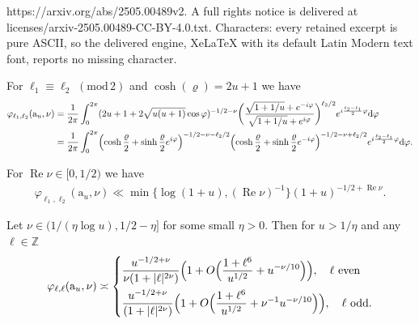 \documentclass[10pt,a4paper]{amsart}
\newcommand{\Z}{{\mathbb Z}}
\renewcommand{\Re}{\operatorname{Re}}
\renewcommand{\a}{\mathrm{a}}
\renewcommand{\d}{\mathrm d}
\renewcommand{\phi}{\varphi}
\renewcommand{\pmod}[1]{\,\,(\mathrm{mod}\,{#1})}
\begin{document}
https://arxiv.org/abs/2505.00489v2. A full rights notice is delivered at licenses/arxiv-2505.00489-CC-BY-4.0.txt. Characters: every retained excerpt is pure ASCII, so the delivered engine, XeLaTeX with its default Latin Modern text font, reports no missing character.
\begin{lemma}\label{lem:phirewritten}
For $\ell_1 \equiv \ell_2 \pmod{2}$ and $ \cosh(\varrho) = 2u+1$  we have
    \begin{align*}
       \phi_{\ell_1,\ell_2}(\a_u,\nu) &= \frac{1}{ 2\pi } \int_0^{2\pi } (2u+1 + 2\sqrt{u(u+1)} \cos \varphi)^{-1/2-\nu}  
 \bigg(\frac{\sqrt{1+1/u} + e^{-i\varphi}}{\sqrt{1+1/u} + e^{i\varphi}}\bigg)^{\ell_2/2} e^{i\frac{\ell_2-\ell_1}{2} \varphi } \d \varphi\\
 &= \frac{1}{2 \pi } \int_0^{2\pi} \Bigl(\cosh \frac{\varrho}{2}+\sinh \frac{\varrho}{2} e^{i \varphi}\Bigr)^{-1/2-\nu-\ell_2/2}\Bigl(\cosh \frac{\varrho}{2}+\sinh \frac{\varrho}{2} e^{-i\varphi}\Bigr)^{-1/2-\nu+\ell_2/2} e^{i\frac{\ell_2-\ell_1}{2} \varphi } \d \varphi.
    \end{align*}
    \end{lemma}

\begin{lemma} \label{le:phitrivialbound}
    For $\Re \nu  \in [0,1/2) $ we have
\begin{align*}
      \phi_{\ell_1,\ell_2}(\a_u,\nu)  \ll \min \{  \log (1+u)  , (\Re\nu)^{-1}\} (1+u)^{-1/2 + \Re \nu}.
\end{align*}
\end{lemma}

\begin{lemma}\label{lem:simplephiasymp}
Let $\nu \in (1/(\eta \log u),1/2-\eta]$ for some small $\eta>0$. Then for $u > 1/\eta$ and any $\ell \in \Z$
\begin{align*}
      \phi_{\ell,\ell}(\a_u,\nu)  \asymp  \begin{dcases}
          \frac{ u^{-1/2+\nu}}{\nu(1+|\ell|^{2\nu})} \Bigl(1+O\Bigl(\frac{1+\ell^{6}}{u^{1/2}} +   u^{-\nu/10}\Bigr)\Bigr), \quad \ell \text{ even} \\
            \frac{ u^{-1/2+\nu}}{(1+|\ell|^{2\nu})} \Bigl(1+O\Bigl(\frac{1+\ell^{6}}{u^{1/2}} +   \nu^{-1} u^{-\nu/10}\Bigr)\Bigr), \quad \ell \text{ odd}.
      \end{dcases}  
\end{align*}
\end{lemma}
\end{document}
